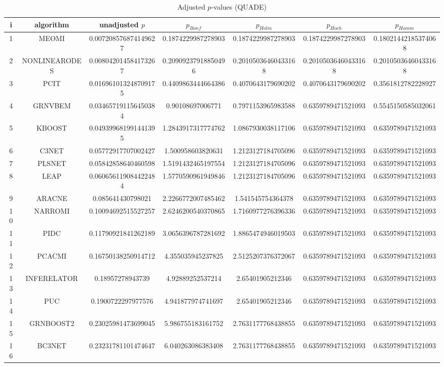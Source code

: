 \documentclass[a4paper,10pt]{article}
\begin{document}
\begin{landscape}
\begin{table}[!htp]
\centering\scriptsize
\caption{Adjusted $p$-values (QUADE)}
\begin{tabular}{ccccccc}
i&algorithm&unadjusted $p$&$p_{Bonf}$&$p_{Holm}$&$p_{Hoch}$&$p_{Homm}$\\
\hline
1&MEOMI&0.007208576874149627&0.1874229987278903&0.1874229987278903&0.1874229987278903&0.18021442185374068\\
2&NONLINEARODES&0.008042014584173267&0.20909237918850496&0.20105036460433168&0.20105036460433168&0.20105036460433168\\
3&PCIT&0.016961013248709175&0.4409863444664386&0.4070643179690202&0.4070643179690202&0.3561812782228927\\
4&GRNVBEM&0.034657191156450384&0.90108697006771&0.7971153965983588&0.6359789471521093&0.5545150585032061\\
5&KBOOST&0.049399681991441395&1.2843917317774762&1.0867930038117106&0.6359789471521093&0.6359789471521093\\
6&C3NET&0.05772917707002427&1.500958603820631&1.2123127184705096&0.6359789471521093&0.6359789471521093\\
7&PLSNET&0.05842858640460598&1.5191432465197554&1.2123127184705096&0.6359789471521093&0.6359789471521093\\
8&LEAP&0.060656119084422484&1.5770590961949846&1.2123127184705096&0.6359789471521093&0.6359789471521093\\
9&ARACNE&0.085641430798021&2.2266772007485462&1.541545754364378&0.6359789471521093&0.6359789471521093\\
10&NARROMI&0.10094692515527257&2.6246200540370865&1.7160977276396336&0.6359789471521093&0.6359789471521093\\
11&PIDC&0.11790921841262189&3.0656396787281692&1.8865474946019503&0.6359789471521093&0.6359789471521093\\
12&PCACMI&0.16750138250914712&4.355035945237825&2.5125207376372067&0.6359789471521093&0.6359789471521093\\
13&INFERELATOR&0.18957278943739&4.92889252537214&2.65401905212346&0.6359789471521093&0.6359789471521093\\
14&PUC&0.1900722297977576&4.941877974741697&2.65401905212346&0.6359789471521093&0.6359789471521093\\
15&GRNBOOST2&0.23025981473699045&5.986755183161752&2.7631177768438855&0.6359789471521093&0.6359789471521093\\
16&BC3NET&0.23231781101474647&6.040263086383408&2.7631177768438855&0.6359789471521093&0.6359789471521093\\

\end{tabular}
\end{table}
\end{landscape}
\end{document}
